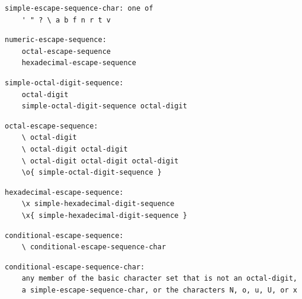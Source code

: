 \noindent\textbf{\texttt{}}\par
\begin{lstlisting}
simple-escape-sequence-char: one of
    ' " ? \ a b f n r t v
\end{lstlisting}

\noindent\textbf{\texttt{}}\par
\begin{lstlisting}
numeric-escape-sequence:
    octal-escape-sequence
    hexadecimal-escape-sequence
\end{lstlisting}

\noindent\textbf{\texttt{}}\par
\begin{lstlisting}
simple-octal-digit-sequence:
    octal-digit
    simple-octal-digit-sequence octal-digit
\end{lstlisting}

\noindent\textbf{\texttt{}}\par
\begin{lstlisting}
octal-escape-sequence:
    \ octal-digit
    \ octal-digit octal-digit
    \ octal-digit octal-digit octal-digit
    \o{ simple-octal-digit-sequence }
\end{lstlisting}

\noindent\textbf{\texttt{}}\par
\begin{lstlisting}
hexadecimal-escape-sequence:
    \x simple-hexadecimal-digit-sequence
    \x{ simple-hexadecimal-digit-sequence }
\end{lstlisting}

\noindent\textbf{\texttt{}}\par
\begin{lstlisting}
conditional-escape-sequence:
    \ conditional-escape-sequence-char
\end{lstlisting}

\noindent\textbf{\texttt{}}\par
\begin{lstlisting}
conditional-escape-sequence-char:
    any member of the basic character set that is not an octal-digit,
    a simple-escape-sequence-char, or the characters N, o, u, U, or x
\end{lstlisting}

